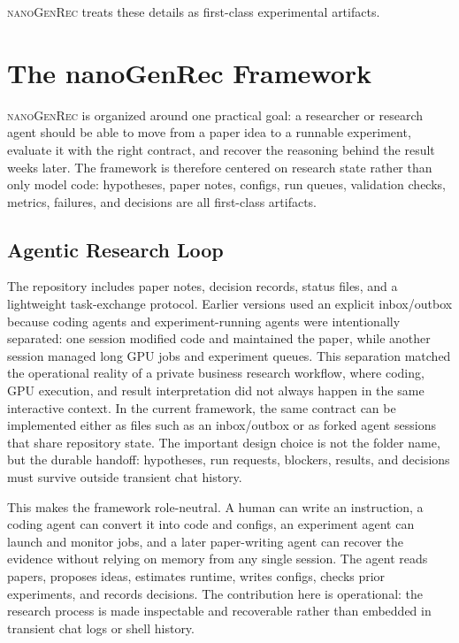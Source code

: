 \documentclass[11pt]{article}
\begin{document}
\textsc{nanoGenRec} treats these details as first-class experimental artifacts.

\section{The nanoGenRec Framework}

\textsc{nanoGenRec} is organized around one practical goal: a researcher or research agent should be able to move from a paper idea to a runnable experiment, evaluate it with the right contract, and recover the reasoning behind the result weeks later. The framework is therefore centered on research state rather than only model code: hypotheses, paper notes, configs, run queues, validation checks, metrics, failures, and decisions are all first-class artifacts.

\subsection{Agentic Research Loop}

The repository includes paper notes, decision records, status files, and a lightweight task-exchange protocol. Earlier versions used an explicit inbox/outbox because coding agents and experiment-running agents were intentionally separated: one session modified code and maintained the paper, while another session managed long GPU jobs and experiment queues. This separation matched the operational reality of a private business research workflow, where coding, GPU execution, and result interpretation did not always happen in the same interactive context. In the current framework, the same contract can be implemented either as files such as an inbox/outbox or as forked agent sessions that share repository state. The important design choice is not the folder name, but the durable handoff: hypotheses, run requests, blockers, results, and decisions must survive outside transient chat history.

This makes the framework role-neutral. A human can write an instruction, a coding agent can convert it into code and configs, an experiment agent can launch and monitor jobs, and a later paper-writing agent can recover the evidence without relying on memory from any single session. The agent reads papers, proposes ideas, estimates runtime, writes configs, checks prior experiments, and records decisions. The contribution here is operational: the research process is made inspectable and recoverable rather than embedded in transient chat logs or shell history.
\end{document}
